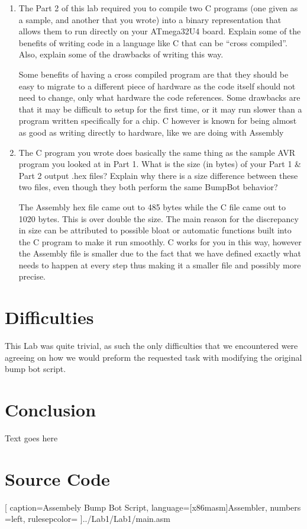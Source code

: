\documentclass[12pt,letterpaper]{article}
\begin{document}
\begin{enumerate}
	\item 
	The Part 2 of this lab required you to compile two C programs (one given as a sample, and another that you wrote) into a binary representation that allows them to run directly on your ATmega32U4 board. Explain some of the benefits of writing code in a language like C that can be “cross compiled”. Also, explain some of the drawbacks of writing this way.
	
	Some benefits of having a cross compiled program are that they should be easy to migrate to a different piece of hardware as the code itself should not need to change, only what hardware the code references. Some drawbacks are that it may be difficult to setup for the first time, or it may run slower than a program written specifically for a chip. C however is known for being almost as good as writing directly to hardware, like we are doing with Assembly 
	
	\item 
	The C program you wrote does basically the same thing as the sample AVR	program you looked at in Part 1. What is the size (in bytes) of your Part 1 \& Part 2 output .hex files? Explain why there is a size difference between these two files, even though they both perform the same BumpBot behavior?
	
	The Assembly hex file came out to 485 bytes while the C file came out to 1020 bytes. This is over double the size. The main reason for the discrepancy in size can be attributed to possible bloat or automatic functions built into the C program to make it run smoothly. C works for you in this way, however the Assembly file is smaller due to the fact that we have defined exactly what needs to happen at every step thus making it a smaller file and possibly more precise.
	

\end{enumerate}

\section{Difficulties}
This Lab was quite trivial, as such the only difficulties that we encountered were agreeing on how we would preform the requested task with modifying the original bump bot script. 

\section{Conclusion}
Text goes here

\section{Source Code}%

[
caption=Assembely Bump Bot Script,
language={[x86masm]Assembler},
numbers =left,
rulesepcolor=\color{blue}
]{../Lab1/Lab1/main.asm}

\end{document}
